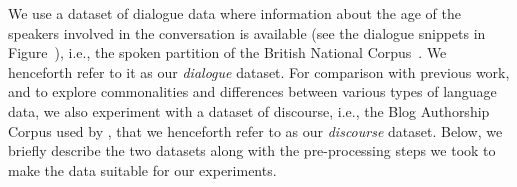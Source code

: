 
        


We use a dataset of dialogue data where information about the age of the speakers involved in the conversation is available (see the dialogue snippets in Figure~), i.e., the spoken partition of the British National Corpus~\cite{love-spoken-bnc-2014}. We henceforth refer to it as our \emph{dialogue} dataset. For comparison with previous work,
and to explore commonalities and differences between various types of language data,
we also experiment with a dataset of discourse, i.e., the Blog Authorship Corpus used by \citet{schler2006effects}, that we henceforth refer to as our \emph{discourse} dataset.
Below, we briefly describe the two datasets along with the pre-processing steps we took to
make the data suitable for 
our experiments.

